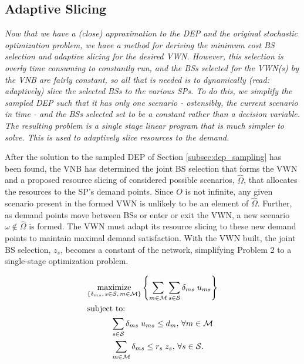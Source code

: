 \documentclass[12pt,dvipsnames]{report}
\begin{document}
\subsection{Adaptive Slicing} \label{subsec:dep_slicing}

\textit{Now that we have a (close) approximation to the DEP and the original stochastic optimization problem, we have a method for deriving the minimum cost BS selection and adaptive slicing for the desired VWN.  However, this selection is overly time consuming to constantly run, and the BSs selected for the VWN(s) by the VNB are fairly constant, so all that is needed is to dynamically (read: adaptively) slice the selected BSs to the various SPs.  To do this, we simplify the sampled DEP such that it has only one scenario - ostensibly, the current scenario in time - and the BSs selected set to be a constant rather than a decision variable.  The resulting problem is a single stage linear program that is much simpler to solve.  This is used to adaptively slice resources to the demand.}

After the solution to the sampled DEP of Section \ref{subsec:dep_sampling} has been found, the VNB has determined the joint BS selection that forms the VWN and a proposed resource slicing of considered possible scenarios, $\hat{\Omega}$, that allocates the resources to the SP's demand points.  Since $O$ is not infinite, any given scenario present in the formed VWN is unlikely to be an element of $\hat{\Omega}$.  Further, as demand points move between BSs or enter or exit the VWN, a new scenario $\omega \notin \hat{\Omega}$ is formed.  The VWN must adapt its resource slicing to these new demand points to maintain maximal demand satisfaction.  With the VWN built, the joint BS selection, $z_s$, becomes a constant of the network, simplifying Problem 2 to a single-stage optimization problem.

\vspace{3mm}
\begin{tcolorbox}[title = Problem 3 (Deterministic Adaptive Slicing)]
\begin{align}
& \underset{\left\{ \substack{
	\delta_{ms},\,	s \in \mathcal{S},\, m \in \mathcal{M}} \right\}} {\text{maximize}}
\left\{ \sum_{m \in \mathcal{M}} \sum_{s \in \mathcal{S}} \delta_{ms} \; u_{ms} \right\} \label{eq:P3}\\
& \text{subject to:}  \nonumber \\
& \hspace{0.4in} \sum_{s \in \mathcal{S}} \delta_{ms} \; u_{ms} \leq d_m,\, \forall m \in \mathcal{M} \label{eq:P3C1}\\
& \hspace{0.4in} \sum_{m \in \mathcal{M}} \delta_{ms} \leq r_s \; z_s,\, \forall s \in \mathcal{S}. \label{eq:P3C2}
\end{align}
\end{tcolorbox}
\end{document}
